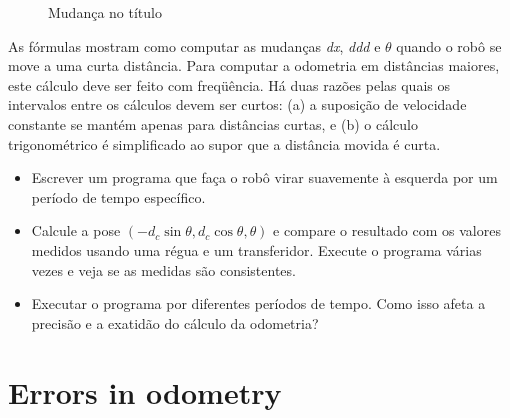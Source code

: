 {\begin{figure}
\begin{center}
\end{center}
\caption{Mudança no título}\label{fig.heading}
\end{figure}

As fórmulas mostram como computar as mudanças \textit{dx}, \textit{ddd} e $\theta$ quando o robô se move a uma curta distância. Para computar a odometria em distâncias maiores, este cálculo deve ser feito com freqüência. Há duas razões pelas quais os intervalos entre os cálculos devem ser curtos: (a) a suposição de velocidade constante se mantém apenas para distâncias curtas, e (b) o cálculo trigonométrico é simplificado ao supor que a distância movida é curta.

\begin{framed}
\begin{itemize}
\item Escrever um programa que faça o robô virar suavemente à esquerda por um período de tempo específico.
\item Calcule a pose $( - d_c \sin \theta, d_c \cos \theta, \theta)$ e compare o resultado com os valores medidos usando uma régua e um transferidor. Execute o programa várias vezes e veja se as medidas são consistentes.
\item Executar o programa por diferentes períodos de tempo. Como isso afeta a precisão e a exatidão do cálculo da odometria?
\end{itemize}
\end{framed}

\section{Errors in odometry}\label{s.odometry-errors}

}
